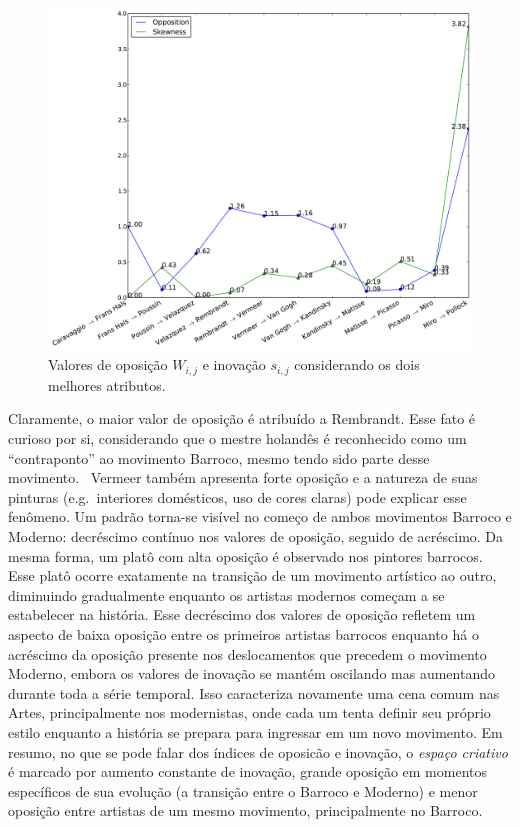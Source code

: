 \begin{figure}[h!]
\begin{center}
        \includegraphics[width=\columnwidth]{figs/caso1_oposEinov}
      \caption{Valores de oposição $W_{i,j}$ e inovação $s_{i,j}$ considerando
        os dois melhores atributos.}
        \label{fig:caso1_oposEinov}
\end{center}
\end{figure}

Claramente, o maior valor de oposição é atribuído a Rembrandt. Esse fato é
curioso por si, considerando que o mestre holandês é reconhecido como um
``contraponto'' ao movimento Barroco, mesmo tendo sido parte desse
movimento.~\cite{gombrich} Vermeer também apresenta forte oposição e a natureza
de suas pinturas (e.g.\ interiores domésticos, uso de cores claras) pode
explicar esse fenômeno. Um padrão torna-se visível no começo de ambos movimentos
Barroco e Moderno: decréscimo contínuo nos valores de oposição, seguido de
acréscimo. Da mesma forma, um platô com alta oposição é observado nos pintores
barrocos. Esse platô ocorre exatamente na transição de um movimento artístico ao
outro, diminuindo gradualmente enquanto os artistas modernos começam a se
estabelecer na história. Esse decréscimo dos valores de oposição refletem um
aspecto de baixa oposição entre os primeiros artistas barrocos enquanto há o acréscimo da
oposição presente nos deslocamentos que precedem o movimento Moderno, embora os
valores de inovação se mantém oscilando mas aumentando durante toda a
série temporal. Isso caracteriza novamente uma cena comum nas Artes,
principalmente nos modernistas, onde cada um tenta definir seu próprio estilo
enquanto a história se prepara para ingressar em um novo movimento. Em resumo,
no que se pode falar dos índices de oposicão e inovação, o
\textit{espaço criativo} é marcado por aumento constante de inovação, grande
oposição em momentos específicos de sua evolução (a transição entre o Barroco e
Moderno) e menor oposição entre artistas de um mesmo movimento, principalmente
no Barroco.


